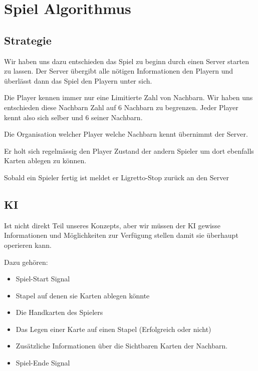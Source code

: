 \section{Spiel Algorithmus} 


\subsection{Strategie}

Wir haben uns dazu entschieden das Spiel zu beginn durch einen Server starten zu lassen. Der Server übergibt alle nötigen Informationen den Playern und überlässt dann das Spiel den Playern unter sich.

Die Player kennen immer nur eine Limitierte Zahl von Nachbarn. Wir haben uns entschieden diese Nachbarn Zahl auf 6 Nachbarn zu begrenzen. Jeder Player kennt also sich selber und 6 seiner Nachbarn.

Die Organisation welcher Player welche Nachbarn kennt übernimmt der Server.

Er holt sich regelmässig den Player Zustand der andern Spieler um dort ebenfalls Karten ablegen zu können.

Sobald ein Spieler fertig ist meldet er Ligretto-Stop zurück an den Server

\subsection{KI}

Ist nicht direkt Teil unseres Konzepts, aber wir müssen der KI gewisse Informationen und Möglichkeiten zur Verfügung stellen damit sie überhaupt operieren kann.

Dazu gehören:
\begin{itemize}
	\item Spiel-Start Signal
	\item Stapel auf denen sie Karten ablegen könnte
	\item Die Handkarten des Spielers
	\item Das Legen einer Karte auf einen Stapel (Erfolgreich oder nicht)
	\item Zusätzliche Informationen über die Sichtbaren Karten der Nachbarn.
	\item Spiel-Ende Signal
\end{itemize}

